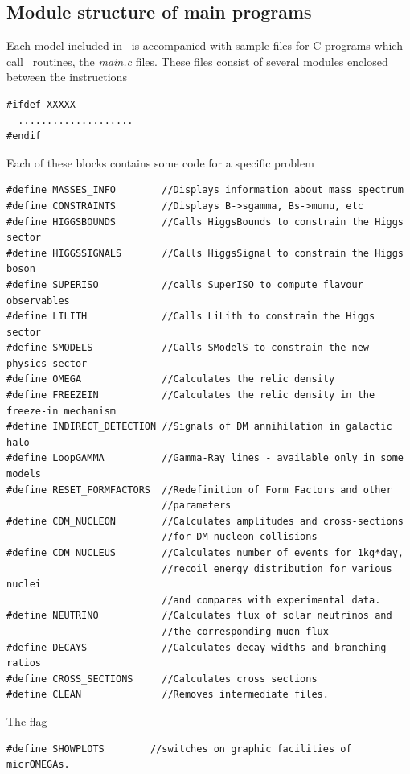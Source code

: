 \documentclass[12pt,a4paper]{article}
\begin{document}
\subsection{Module structure of main programs}
Each model included in \micro\  is accompanied with sample files for
C  programs which call \micro\ routines, the {\it main.c}  files.  
These files   consist of
several modules enclosed between the instructions
\begin{verbatim}
#ifdef XXXXX
  ....................
#endif
\end{verbatim}
Each of these blocks  contains some code for a specific problem
{\small
\begin{verbatim}
#define MASSES_INFO        //Displays information about mass spectrum 
#define CONSTRAINTS        //Displays B->sgamma, Bs->mumu, etc
#define HIGGSBOUNDS        //Calls HiggsBounds to constrain the Higgs sector
#define HIGGSSIGNALS       //Calls HiggsSignal to constrain the Higgs boson
#define SUPERISO           //calls SuperISO to compute flavour observables
#define LILITH             //Calls LiLith to constrain the Higgs sector
#define SMODELS            //Calls SModelS to constrain the new physics sector
#define OMEGA              //Calculates the relic density 
#define FREEZEIN           //Calculates the relic density in the freeze-in mechanism
#define INDIRECT_DETECTION //Signals of DM annihilation in galactic halo
#define LoopGAMMA          //Gamma-Ray lines - available only in some models
#define RESET_FORMFACTORS  //Redefinition of Form Factors and other
                           //parameters 
#define CDM_NUCLEON        //Calculates amplitudes and cross-sections
                           //for DM-nucleon collisions 
#define CDM_NUCLEUS        //Calculates number of events for 1kg*day,
                           //recoil energy distribution for various nuclei
                           //and compares with experimental data.
#define NEUTRINO           //Calculates flux of solar neutrinos and
                           //the corresponding muon flux 
#define DECAYS             //Calculates decay widths and branching ratios  
#define CROSS_SECTIONS     //Calculates cross sections 
#define CLEAN              //Removes intermediate files.
\end{verbatim}

}

The  flag \\
\begin{verbatim}
#define SHOWPLOTS        //switches on graphic facilities of micrOMEGAs.
\end{verbatim}
\end{document}
